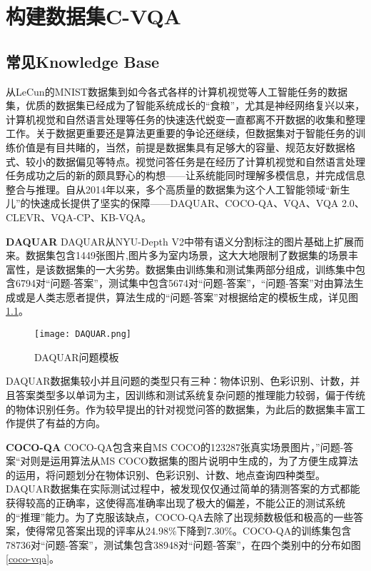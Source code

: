 \chapter{构建数据集C-VQA}
\section{常见Knowledge Base}
从LeCun的MNIST数据集到如今各式各样的计算机视觉等人工智能任务的数据集，优质的数据集已经成为了智能系统成长的“食粮”，尤其是神经网络复兴以来，计算机视觉和自然语言处理等任务的快速迭代蜕变一直都离不开数据的收集和整理工作。关于数据更重要还是算法更重要的争论还继续，但数据集对于智能任务的训练价值是有目共睹的，当然，前提是数据集具有足够大的容量、规范友好数据格式、较小的数据偏见等特点。视觉问答任务是在经历了计算机视觉和自然语言处理任务成功之后的新的颇具野心的构想——让系统能同时理解多模信息，并完成信息整合与推理。自从2014年以来，多个高质量的数据集为这个人工智能领域“新生儿”的快速成长提供了坚实的保障——DAQUAR、COCO-QA、VQA、VQA 2.0、CLEVR、VQA-CP、KB-VQA。

\textbf{DAQUAR}
DAQUAR从NYU-Depth V2中带有语义分割标注的图片基础上扩展而来。数据集包含1449张图片,图片多为室内场景，这大大地限制了数据集的场景丰富性，是该数据集的一大劣势。数据集由训练集和测试集两部分组成，训练集中包含6794对“问题-答案”，测试集中包含5674对“问题-答案”，“问题-答案”对由算法生成或是人类志愿者提供，算法生成的“问题-答案”对根据给定的模板生成，详见图\ref{DAQUAR}。

\begin{figure}[H]
	\texttt{[image: DAQUAR.png]}
	\caption{DAQUAR问题模板}
	\label{DAQUAR}
\end{figure}
DAQUAR数据集较小并且问题的类型只有三种：物体识别、色彩识别、计数，并且答案类型多以单词为主，因训练和测试系统复杂问题的推理能力较弱，偏于传统的物体识别任务。作为较早提出的针对视觉问答的数据集，为此后的数据集丰富工作提供了有益的方向。

\textbf{COCO-QA}
COCO-QA包含来自MS COCO的123287张真实场景图片，”问题-答案“对则是运用算法从MS COCO数据集的图片说明中生成的，为了方便生成算法的运用，将问题划分在物体识别、色彩识别、计数、地点查询四种类型。DAQUAR数据集在实际测试过程中，被发现仅仅通过简单的猜测答案的方式都能获得较高的正确率，这使得高准确率出现了极大的偏差，不能公正的测试系统的“推理”能力。为了克服该缺点，COCO-QA去除了出现频数极低和极高的一些答案，使得常见答案出现的评率从24.98\%下降到7.30\%。COCO-QA的训练集包含78736对“问题-答案”，测试集包含38948对“问题-答案”，在四个类别中的分布如图\ref{coco-vqa}。

